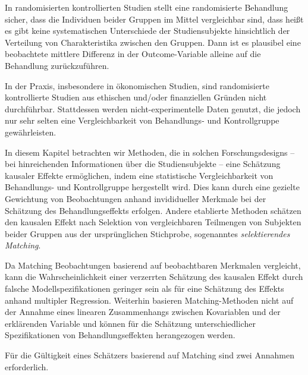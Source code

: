 \documentclass[
  a4paper,
  DIV=11,
  oneside]{scrreprt}
\begin{document}
In randomisierten kontrollierten Studien stellt eine randomisierte
Behandlung sicher, dass die Individuen beider Gruppen im Mittel
vergleichbar sind, dass heißt es gibt keine systematischen Unterschiede
der Studiensubjekte hinsichtlich der Verteilung von Charakteristika
zwischen den Gruppen. Dann ist es plausibel eine beobachtete mittlere
Differenz in der Outcome-Variable alleine auf die Behandlung
zurückzuführen.

In der Praxis, insbesondere in ökonomischen Studien, sind randomisierte
kontrollierte Studien aus ethischen und/oder finanziellen Gründen nicht
durchführbar. Stattdessen werden nicht-experimentelle Daten genutzt, die
jedoch nur sehr selten eine Vergleichbarkeit von Behandlungs- und
Kontrollgruppe gewährleisten.

In diesem Kapitel betrachten wir Methoden, die in solchen
Forschungsdesigns -- bei hinreichenden Informationen über die
Studiensubjekte -- eine Schätzung kausaler Effekte ermöglichen, indem
eine statistische Vergleichbarkeit von Behandlungs- und Kontrollgruppe
hergestellt wird. Dies kann durch eine gezielte Gewichtung von
Beobachtungen anhand invididueller Merkmale bei der Schätzung des
Behandlungseffekts erfolgen. Andere etablierte Methoden schätzen den
kausalen Effekt nach Selektion von vergleichbaren Teilmengen von
Subjekten beider Gruppen aus der ursprünglichen Stichprobe, sogenanntes
\emph{selektierendes Matching}.

Da Matching Beobachtungen basierend auf beobachtbaren Merkmalen
vergleicht, kann die Wahrscheinlichkeit einer verzerrten Schätzung des
kausalen Effekt durch falsche Modellspezifikationen geringer sein als
für eine Schätzung des Effekts anhand multipler Regression. Weiterhin
basieren Matching-Methoden nicht auf der Annahme eines linearen
Zusammenhangs zwischen Kovariablen und der erklärenden Variable und
können für die Schätzung unterschiedlicher Spezifikationen von
Behandlungseffekten herangezogen werden.

Für die Gültigkeit eines Schätzers basierend auf Matching sind zwei
Annahmen erforderlich.
\end{document}
